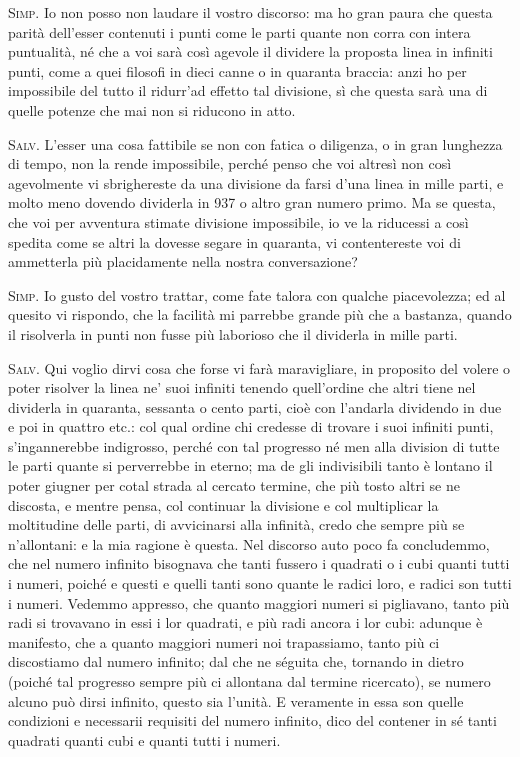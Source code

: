 \documentclass[11pt,twoside,openany]{book}
\newcommand{\speaker}[1]{\textcolor{rubric}{\textsc{#1}}\space}
\begin{document}
\speaker{Simp.} Io non posso non laudare il vostro discorso: ma ho gran paura che questa parità dell'esser contenuti i punti come le parti quante non corra con intera puntualità, né che a voi sarà così agevole il dividere la proposta linea in infiniti punti, come a quei filosofi in dieci canne o in quaranta braccia: anzi ho per impossibile del tutto il ridurr'ad effetto tal divisione, sì che questa sarà una di quelle potenze che mai non si riducono in atto.

\speaker{Salv.} L'esser una cosa fattibile se non con fatica o diligenza, o in gran lunghezza di tempo, non la rende impossibile, perché penso che voi altresì non così agevolmente vi sbrighereste da una divisione da farsi d'una linea in mille parti, e molto meno dovendo dividerla in 937 o altro gran numero primo. Ma se questa, che voi per avventura stimate divisione impossibile, io ve la riducessi a così spedita come se altri la dovesse segare in quaranta, vi contentereste voi di ammetterla più placidamente nella nostra conversazione?

\speaker{Simp.} Io gusto del vostro trattar, come fate talora con qualche piacevolezza; ed al quesito vi rispondo, che la facilità mi parrebbe grande più che a bastanza, quando il risolverla in punti non fusse più laborioso che il dividerla in mille parti.

\speaker{Salv.} Qui voglio dirvi cosa che forse vi farà maravigliare, in proposito del volere o poter risolver la linea ne' suoi infiniti tenendo quell'ordine che altri tiene nel dividerla in quaranta, sessanta o cento parti, cioè con l'andarla dividendo in due e poi in quattro etc.: col qual ordine chi credesse di trovare i suoi infiniti punti, s'ingannerebbe indigrosso, perché con tal progresso né men alla division di tutte le parti quante si perverrebbe in eterno; ma de gli indivisibili tanto è lontano il poter giugner per cotal strada al cercato termine, che più tosto altri se ne discosta, e mentre pensa, col continuar la divisione e col multiplicar la moltitudine delle parti, di avvicinarsi alla infinità, credo che sempre più se n'allontani: e la mia ragione è questa. Nel discorso auto poco fa concludemmo, che nel numero infinito bisognava che tanti fussero i quadrati o i cubi quanti tutti i numeri, poiché e questi e quelli tanti sono quante le radici loro, e radici son tutti i numeri. Vedemmo appresso, che quanto maggiori numeri si pigliavano, tanto più radi si trovavano in essi i lor quadrati, e più radi ancora i lor cubi: adunque è manifesto, che a quanto maggiori numeri noi trapassiamo, tanto più ci discostiamo dal numero infinito; dal che ne séguita che, tornando in dietro (poiché tal progresso sempre più ci allontana dal termine ricercato), se numero alcuno può dirsi infinito, questo sia l'unità. E veramente in essa son quelle condizioni e necessarii requisiti del numero infinito, dico del contener in sé tanti quadrati quanti cubi e quanti tutti i numeri.
\end{document}
